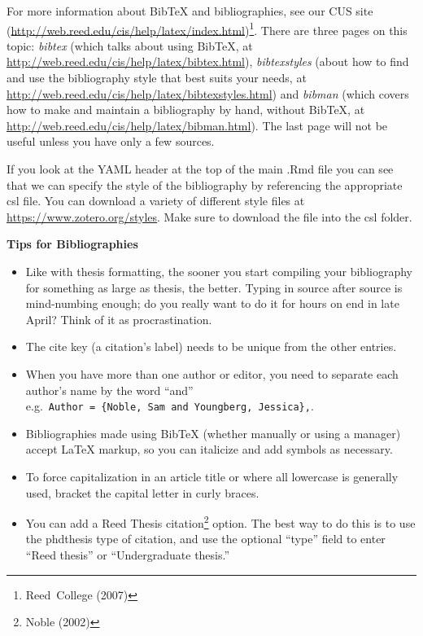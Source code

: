 \documentclass[
  letterpaper,
  12pt,
  twoside]{book}
\providecommand{\tightlist}{%
  \setlength{\itemsep}{0pt}\setlength{\parskip}{0pt}}
\begin{document}
For more information about BibTeX and bibliographies, see our CUS site
(\url{http://web.reed.edu/cis/help/latex/index.html})\footnote{Reed~College
  (2007)}. There are three pages on this topic: \emph{bibtex} (which
talks about using BibTeX, at
\url{http://web.reed.edu/cis/help/latex/bibtex.html}),
\emph{bibtexstyles} (about how to find and use the bibliography style
that best suits your needs, at
\url{http://web.reed.edu/cis/help/latex/bibtexstyles.html}) and
\emph{bibman} (which covers how to make and maintain a bibliography by
hand, without BibTeX, at
\url{http://web.reed.edu/cis/help/latex/bibman.html}). The last page
will not be useful unless you have only a few sources.

If you look at the YAML header at the top of the main .Rmd file you can
see that we can specify the style of the bibliography by referencing the
appropriate csl file. You can download a variety of different style
files at \url{https://www.zotero.org/styles}. Make sure to download the
file into the csl folder.

\textbf{Tips for Bibliographies}

\begin{itemize}
\tightlist
\item
  Like with thesis formatting, the sooner you start compiling your
  bibliography for something as large as thesis, the better. Typing in
  source after source is mind-numbing enough; do you really want to do
  it for hours on end in late April? Think of it as procrastination.
\item
  The cite key (a citation's label) needs to be unique from the other
  entries.
\item
  When you have more than one author or editor, you need to separate
  each author's name by the word ``and''
  e.g.~\texttt{Author\ =\ \{Noble,\ Sam\ and\ Youngberg,\ Jessica\},}.
\item
  Bibliographies made using BibTeX (whether manually or using a manager)
  accept LaTeX markup, so you can italicize and add symbols as
  necessary.
\item
  To force capitalization in an article title or where all lowercase is
  generally used, bracket the capital letter in curly braces.
\item
  You can add a Reed Thesis citation\footnote{Noble (2002)} option. The
  best way to do this is to use the phdthesis type of citation, and use
  the optional ``type'' field to enter ``Reed thesis'' or
  ``Undergraduate thesis.''
\end{itemize}
\end{document}
